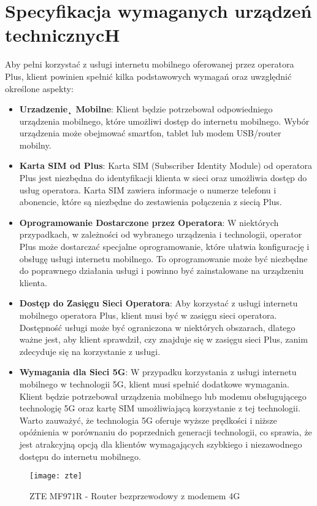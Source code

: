 \section{Specyfikacja wymaganych urządzeń technicznycH}

Aby pełni korzystać z usługi internetu mobilnego oferowanej przez operatora Plus, klient powinien spełnić kilka podstawowych wymagań oraz uwzględnić określone aspekty:

\begin{itemize}
    \item \textbf{Urzadzenie˛ Mobilne}: Klient będzie potrzebował odpowiedniego urządzenia mobilnego, które umożliwi dostęp do internetu mobilnego. Wybór urządzenia może obejmować smartfon, tablet lub modem USB/router mobilny.
    \item \textbf{Karta SIM od Plus}: Karta SIM (Subscriber Identity Module) od operatora Plus jest niezbędna do identyfikacji klienta w sieci oraz umożliwia dostęp do usług operatora. Karta SIM zawiera informacje o numerze telefonu i abonencie, które są niezbędne do zestawienia połączenia z siecią Plus.
    \item \textbf{Oprogramowanie Dostarczone przez Operatora}: W niektórych przypadkach, w zależności od wybranego urządzenia i technologii, operator Plus może dostarczać specjalne oprogramowanie, które ułatwia konfigurację i obsługę usługi internetu mobilnego. To oprogramowanie może być niezbędne do poprawnego działania usługi i powinno być zainstalowane na urządzeniu klienta.
    \item \textbf{Dostęp do Zasięgu Sieci Operatora}: Aby korzystać z usługi internetu mobilnego operatora Plus, klient musi być w zasięgu sieci operatora. Dostępność usługi może być ograniczona w niektórych obszarach, dlatego ważne jest, aby klient sprawdził, czy znajduje się w zasięgu sieci Plus, zanim zdecyduje się na korzystanie z usługi.
    \item \textbf{Wymagania dla Sieci 5G}: W przypadku korzystania z usługi internetu mobilnego w technologii 5G, klient musi spełnić dodatkowe wymagania. Klient będzie potrzebował urządzenia mobilnego lub modemu obsługującego technologię 5G oraz kartę SIM umożliwiającą korzystanie z tej technologii. Warto zauważyć, że technologia 5G oferuje wyższe prędkości i niższe opóźnienia w porównaniu do poprzednich generacji technologii, co sprawia, że jest atrakcyjną opcją dla klientów wymagających szybkiego i niezawodnego dostępu do internetu mobilnego.
\end{itemize}


\begin{figure}[!htb]
    \centering
    \texttt{[image: zte]}
    \caption{ZTE MF971R - Router bezprzewodowy z modemem 4G  }
\end{figure}
